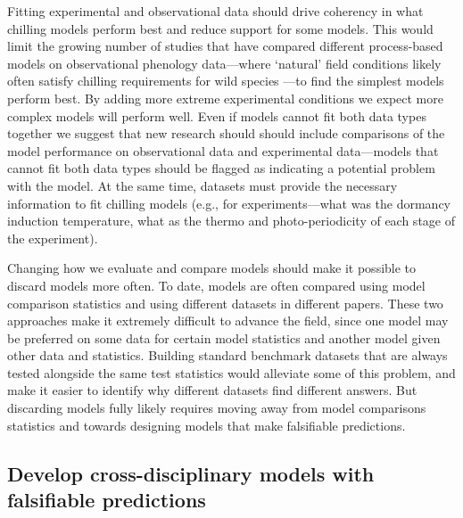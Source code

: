 \documentclass[11pt]{article}
\begin{document}
Fitting experimental and observational data should drive coherency in what chilling models perform best and reduce support for some models. This would limit the growing number of studies that have compared different process-based models on observational phenology data---where `natural' field conditions likely often satisfy chilling requirements for wild species \citep{basler2016evaluating,hufkens2018integrated}---to find the simplest models perform best. By adding more extreme experimental conditions we expect more complex models will perform well. Even if models cannot fit both data types together we suggest that new research should should include comparisons of the model performance on observational data and experimental data---models that cannot fit both data types should be flagged as indicating a potential problem with the model.  At the same time, datasets must provide the necessary information to fit chilling models (e.g., for experiments---what was the dormancy induction temperature, what as the thermo and photo-periodicity of each stage of the experiment). 

Changing how we evaluate and compare models should make it possible to discard models more often.  To date, models are often compared using model comparison statistics and using different datasets in different papers. These two approaches make it extremely difficult to advance the field, since one model may be preferred on some data for certain model statistics and another model given other data and statistics. Building standard benchmark datasets that are always tested alongside the same test statistics would alleviate some of this problem, and make it easier to identify why different datasets find different answers. But discarding models fully likely requires moving away from model comparisons statistics and towards designing models that make falsifiable predictions.


\subsection*{Develop cross-disciplinary models with falsifiable predictions} 
\end{document}

